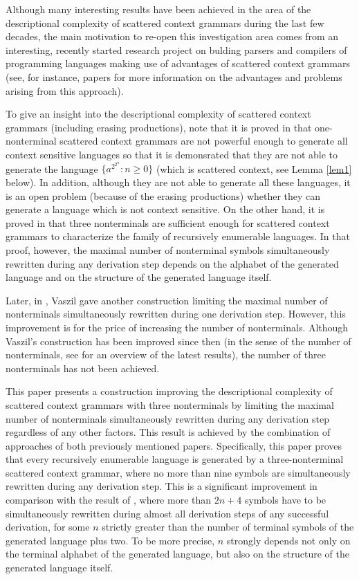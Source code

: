 \documentclass[copyright]{eptcs}
\begin{document}
  Although many interesting results have been achieved in the area of the descriptional complexity of scattered context grammars during the last few decades, the main motivation to re-open this investigation area comes from an interesting, recently started research project on bulding parsers and compilers of programming languages making use of advantages of scattered context grammars (see, for instance, papers \cite{kolar,rychnov} for more information on the advantages and problems arising from this approach).

  To give an insight into the descriptional complexity of scattered context grammars (including erasing productions), note that it is proved in \cite{meduna2} that one\mbox{-}nonterminal scattered context grammars are not powerful enough to generate all context sensitive languages so that it is demonsrated that they are not able to generate the language $\{a^{2^{2^n}} : n\ge 0\}$ (which is scattered context, see Lemma \ref{lem1} below). In addition, although they are not able to generate all these languages, it is an open problem (because of the erasing productions) whether they can generate a language which is not context sensitive. On the other hand, it is proved in \cite{Meduna00b} that three nonterminals are sufficient enough for scattered context grammars to characterize the family of recursively enumerable languages. In that proof, however, the maximal number of nonterminal symbols simultaneously rewritten during any derivation step depends on the alphabet of the generated language and on the structure of the generated language itself.

  Later, in \cite{vaszil}, Vaszil gave another construction limiting the maximal number of nonterminals simultaneously rewritten during one derivation step. However, this improvement is for the price of increasing the number of nonterminals. Although Vaszil's construction has been improved since then (in the sense of the number of nonterminals, see \cite{masopustTCS} for an overview of the latest results), the number of three nonterminals has not been achieved.

  This paper presents a construction improving the descriptional complexity of scattered context grammars with three nonterminals by limiting the maximal number of nonterminals simultaneously rewritten during any derivation step regardless of any other factors. This result is achieved by the combination of approaches of both previously mentioned papers. Specifically, this paper proves that every recursively enumerable language is generated by a three-nonterminal scattered context grammar, where no more than nine symbols are simultaneously rewritten during any derivation step. This is a significant improvement in comparison with the result of \cite{Meduna00b}, where more than $2n+4$ symbols have to be simultaneously rewritten during almost all derivation steps of any successful derivation, for some $n$ strictly greater than the number of terminal symbols of the generated language plus two. To be more precise, $n$ strongly depends not only on the terminal alphabet of the generated language, but also on the structure of the generated language itself.
\end{document}
